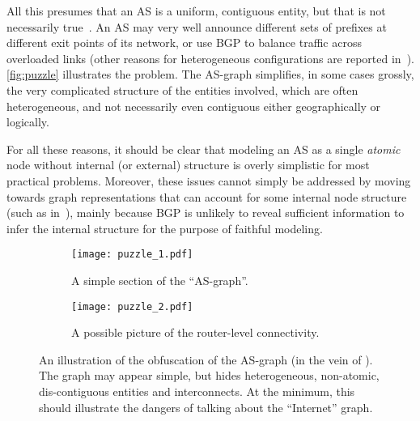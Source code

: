 All this presumes that an AS is a uniform, contiguous entity, but that
is not necessarily
true~\cite{muehlbauer06:_build_as,muehlbauer07:_in_search}. An AS may
very well announce different sets of prefixes at different exit points
of its network, or use BGP to balance traffic across overloaded links
(other reasons for heterogeneous configurations are reported
in~\cite{bush09:_inter_optom}). \autoref{fig:puzzle} illustrates the
problem. The AS-graph simplifies, in some cases grossly, the very
complicated structure of the entities involved, which are often
heterogeneous, and not necessarily even contiguous either
geographically or logically.

For all these reasons, it should be clear that modeling an AS as a single 
{\em atomic} node without internal (or external) structure is overly simplistic 
for most practical problems. Moreover, these issues cannot simply be addressed 
by moving towards graph representations that can account for some internal 
node structure (such as in~\cite{muehlbauer06:_build_as}), mainly because 
BGP is unlikely to reveal sufficient information to infer the internal structure 
for the purpose of faithful modeling.

\begin{figure}[!th] 
  \begin{center}
    \begin{subfigure}[b]{0.34\textwidth}
      \centering 
      \texttt{[image: puzzle\_1.pdf]}
      \vspace{17mm}
      \caption{A simple section of the ``AS-graph''.}
    \end{subfigure}
    \hspace{0.05\textwidth}
    \begin{subfigure}[b]{0.54\textwidth}
      \centering
      \texttt{[image: puzzle\_2.pdf]}
      \caption{A possible picture of the router-level connectivity.}
    \end{subfigure}
    \caption{An illustration of the obfuscation of the AS-graph
      (in the vein of \cite{griffin02:_under_border_gatew_protoc_bgp}). The
      graph may appear simple, but hides heterogeneous, non-atomic,
      dis-contiguous entities and interconnects. At the minimum, this
      should illustrate the dangers of talking about the ``Internet''
      graph. \label{fig:puzzle}}
  \end{center}
\end{figure}         

